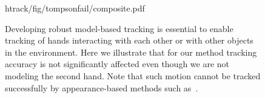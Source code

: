 \begin{figure}[b]
\centering
\begin{overpic} 
[width=\linewidth]
{htrack/fig/tompsonfail/composite.pdf}
\putfilename
\end{overpic}
\caption{
% 
Developing robust model-based tracking is essential to enable tracking of hands interacting with each other or with other objects in the environment.
Here we illustrate that for our method tracking accuracy is not significantly affected even though we are not modeling the second hand.
Note that such motion cannot be tracked successfully by appearance-based methods such as~\protect\cite{tompson_tog14}.
% 
% 
} %
\label{fig:tompsonfail}
\end{figure}